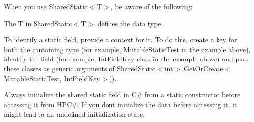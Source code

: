 When you use {\ttfamily Shared\+Static\texorpdfstring{$<$}{<}T\texorpdfstring{$>$}{>}}, be aware of the following\+:


\begin{DoxyItemize}
\item The {\ttfamily T} in {\ttfamily Shared\+Static\texorpdfstring{$<$}{<}T\texorpdfstring{$>$}{>}} defines the data type.
\item To identify a static field, provide a context for it. To do this, create a key for both the containing type (for example, {\ttfamily Mutable\+Static\+Test} in the example above), identify the field (for example, {\ttfamily Int\+Field\+Key} class in the example above) and pass these classes as generic arguments of {\ttfamily Shared\+Static\texorpdfstring{$<$}{<}int\texorpdfstring{$>$}{>}.Get\+Or\+Create\texorpdfstring{$<$}{<}Mutable\+Static\+Test, Int\+Field\+Key\texorpdfstring{$>$}{>}()}.
\item Always initialize the shared static field in C\# from a static constructor before accessing it from HPC\#. If you don\textquotesingle{}t initialize the data before accessing it, it might lead to an undefined initialization state. 
\end{DoxyItemize}